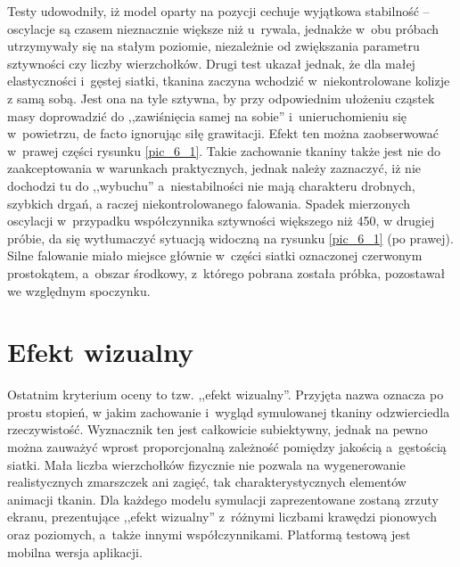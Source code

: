 		Testy udowodniły, iż model oparty na pozycji cechuje wyjątkowa stabilność -- oscylacje są czasem nieznacznie większe niż u~rywala, jednakże w~obu próbach utrzymywały się na stałym poziomie, niezależnie od zwiększania parametru sztywności czy liczby wierzchołków. Drugi test ukazał jednak, że dla małej elastyczności i~gęstej siatki, tkanina zaczyna wchodzić w~niekontrolowane kolizje z samą sobą. Jest ona na tyle sztywna, by przy odpowiednim ułożeniu cząstek masy doprowadzić do ,,zawiśnięcia samej na sobie'' i~unieruchomieniu się w~powietrzu, de facto ignorując siłę grawitacji. Efekt ten można zaobserwować w~prawej części rysunku \ref{pic_6_1}. Takie zachowanie tkaniny także jest nie do zaakceptowania w warunkach praktycznych, jednak należy zaznaczyć, iż nie dochodzi tu do ,,wybuchu'' a~niestabilności nie mają charakteru drobnych, szybkich drgań, a raczej niekontrolowanego falowania. Spadek mierzonych oscylacji w~przypadku współczynnika sztywności większego niż 450, w drugiej próbie, da się wytłumaczyć sytuacją widoczną na rysunku \ref{pic_6_1} (po prawej). Silne falowanie miało miejsce głównie w~części siatki oznaczonej czerwonym prostokątem, a~obszar środkowy, z~którego pobrana została próbka, pozostawał we względnym spoczynku.
		
		
		
		
		
	\section{Efekt wizualny}
	\label{t:wyniki:efektwiz}
		
		Ostatnim kryterium oceny to tzw. ,,efekt wizualny''. Przyjęta nazwa oznacza po prostu stopień, w jakim zachowanie i~wygląd symulowanej tkaniny odzwierciedla rzeczywistość. Wyznacznik ten jest całkowicie subiektywny, jednak na pewno można zauważyć wprost proporcjonalną zależność pomiędzy jakością a~gęstością siatki. Mała liczba wierzchołków fizycznie nie pozwala na wygenerowanie realistycznych zmarszczek ani zagięć, tak charakterystycznych elementów animacji tkanin. Dla każdego modelu symulacji zaprezentowane zostaną zrzuty ekranu, prezentujące ,,efekt wizualny'' z~różnymi liczbami krawędzi pionowych oraz poziomych, a~także innymi współczynnikami. Platformą testową jest mobilna wersja aplikacji.
		
